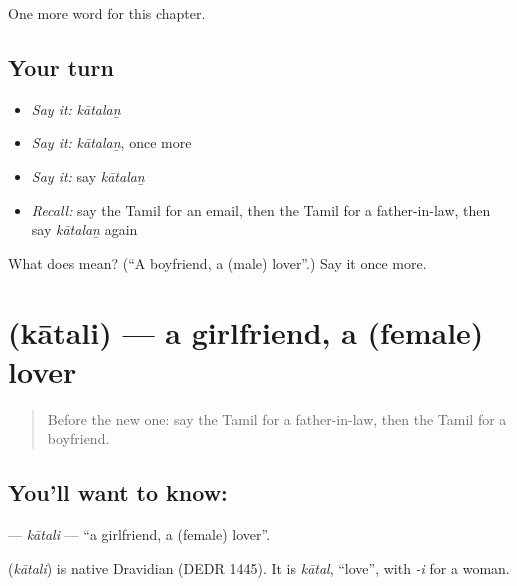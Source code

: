\begin{grammarlens}[title={What you've built}]
One more word for this chapter.
\end{grammarlens}

\subsection*{Your turn}
\begin{itemize}
\raggedright
  \item \emph{Say it:} \emph{kātalaṉ}
  \item \emph{Say it:} \emph{kātalaṉ}, once more
  \item \emph{Say it:} say \emph{kātalaṉ}
  \item \emph{Recall:} say the Tamil for an email, then the Tamil for a father-in-law, then say \emph{kātalaṉ} again
\end{itemize}

\begin{tcolorbox}[breakable,colback=teal!4,colframe=teal!35!black,title={Before you move on}]
What does  mean? (\textquotedblleft{}A boyfriend, a (male) lover\textquotedblright{}.) Say it once more.
\end{tcolorbox}
\section[\texorpdfstring{\ta{காதலி} (kātali)}{காதலி (kātali)}]{ (kātali) — a girlfriend, a (female) lover}

\label{lesson:TA-C186-katali}



\begin{quote}
Before the new one: say the Tamil for a father-in-law, then the Tamil for a boyfriend.
\end{quote}

\subsection*{You'll want to know: }
\textbf{} — \emph{kātali} — \textquotedblleft{}a girlfriend, a (female) lover\textquotedblright{}.

\begin{cousinweb}
\textbf{} (\emph{kātali}) is native Dravidian (DEDR 1445). It is \emph{kātal}, \textquotedblleft{}love\textquotedblright{}, with \emph{-i} for a woman.
\end{cousinweb}

